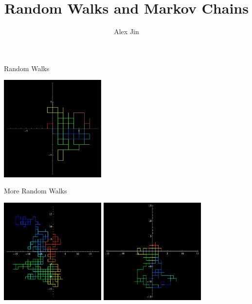 \documentclass[aspectratio=169, handout]{beamer}
\title{Random Walks and Markov Chains}
\subtitle{}
\author{Alex Jin}
\date{}
\begin{document}

\begin{frame}
\titlepage
\end{frame}

\begin{frame}{Random Walks}
    \begin{center}
        \includegraphics[width=150pt]{rwanimate/rwanimate-35.png}
    \end{center}
\end{frame}

\begin{frame}{More Random Walks}
    \begin{center}
        \includegraphics[width=150pt]{rws/rw0.png}
        \includegraphics[width=150pt]{rws/rw00.png}
    \end{center}
\end{frame}
\end{document}
